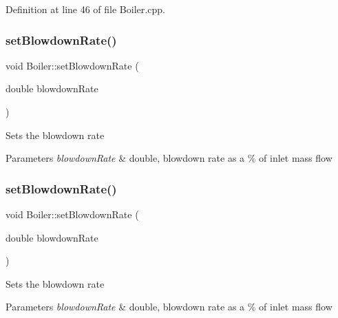 Definition at line 46 of file Boiler.\+cpp.

\mbox{\label{class_boiler_a66c0e4c577dbd3f52dcf202e69a08371}} 
\subsubsection{\texorpdfstring{set\+Blowdown\+Rate()}{setBlowdownRate()}\hspace{0.1cm}{\footnotesize\ttfamily [1/3]}}
{\footnotesize\ttfamily void Boiler\+::set\+Blowdown\+Rate (\begin{DoxyParamCaption}\item[{double}]{blowdown\+Rate }\end{DoxyParamCaption})}

Sets the blowdown rate 
\begin{DoxyParams}{Parameters}
{\em blowdown\+Rate} & double, blowdown rate as a \% of inlet mass flow \\
\hline
\end{DoxyParams}
\mbox{\label{class_boiler_a66c0e4c577dbd3f52dcf202e69a08371}} 
\subsubsection{\texorpdfstring{set\+Blowdown\+Rate()}{setBlowdownRate()}\hspace{0.1cm}{\footnotesize\ttfamily [2/3]}}
{\footnotesize\ttfamily void Boiler\+::set\+Blowdown\+Rate (\begin{DoxyParamCaption}\item[{double}]{blowdown\+Rate }\end{DoxyParamCaption})}

Sets the blowdown rate 
\begin{DoxyParams}{Parameters}
{\em blowdown\+Rate} & double, blowdown rate as a \% of inlet mass flow \\
\hline
\end{DoxyParams}
\mbox{\label{class_boiler_a66c0e4c577dbd3f52dcf202e69a08371}} 
